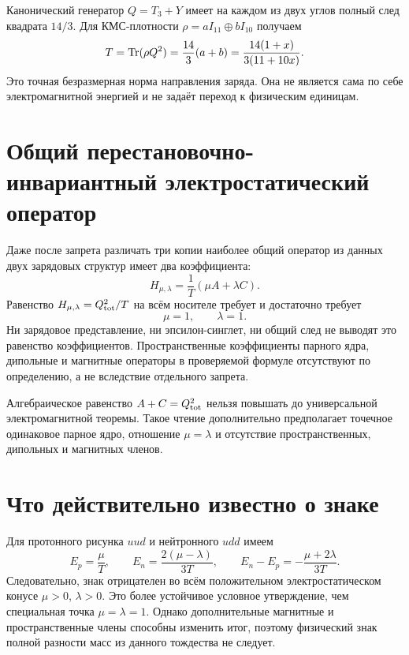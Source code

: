 Канонический генератор $Q=T_3+Y$ имеет на каждом из двух углов полный след
квадрата $14/3$. Для КМС-плотности
$\rho=aI_{11}\oplus bI_{10}$ получаем
\begin{equation}
 T=\operatorname{Tr}(\rho Q^2)=\frac{14}{3}(a+b)
 =\frac{14(1+x)}{3(11+10x)}.
 \label{eq:v8-baryon-em-common-trace-norm}
\end{equation}
Это точная безразмерная норма направления заряда. Она не является сама по
себе электромагнитной энергией и не задаёт переход к физическим единицам.

\section{Общий перестановочно-инвариантный электростатический оператор}

Даже после запрета различать три копии наиболее общий оператор из данных
двух зарядовых структур имеет два коэффициента:
\begin{equation}
 H_{\mu,\lambda}=\frac1T(\mu A+\lambda C).
 \label{eq:v8-baryon-em-two-coefficient-form}
\end{equation}
Равенство $H_{\mu,\lambda}=Q_{\rm tot}^2/T$ на всём носителе требует и
достаточно требует
\begin{equation}
 \mu=1,
 \qquad
 \lambda=1.
 \label{eq:v8-baryon-em-collapse-condition}
\end{equation}
Ни зарядовое представление, ни эпсилон-синглет, ни общий след не выводят
это равенство коэффициентов. Пространственные коэффициенты парного ядра,
дипольные и магнитные операторы в проверяемой формуле отсутствуют по
определению, а не вследствие отдельного запрета.

\begin{nogocriterion}
Алгебраическое равенство $A+C=Q_{\rm tot}^2$ нельзя повышать до
универсальной электромагнитной теоремы. Такое чтение дополнительно
предполагает точечное одинаковое парное ядро, отношение $\mu=\lambda$ и
отсутствие пространственных, дипольных и магнитных членов.
\end{nogocriterion}

\section{Что действительно известно о знаке}

Для протонного рисунка $uud$ и нейтронного $udd$ имеем
\begin{equation}
 E_p=\frac{\mu}{T},
 \qquad
 E_n=\frac{2(\mu-\lambda)}{3T},
 \qquad
 E_n-E_p=-\frac{\mu+2\lambda}{3T}.
 \label{eq:v8-baryon-em-neutron-proton-sign}
\end{equation}
Следовательно, знак отрицателен во всём положительном электростатическом
конусе $\mu>0$, $\lambda>0$. Это более устойчивое условное утверждение,
чем специальная точка $\mu=\lambda=1$. Однако дополнительные магнитные и
пространственные члены способны изменить итог, поэтому физический знак
полной разности масс из данного тождества не следует.

